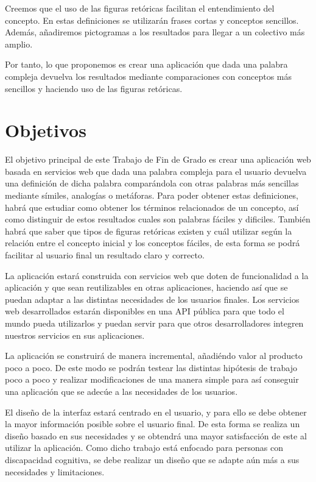 Creemos que el uso de las figuras retóricas facilitan el entendimiento del concepto. En estas definiciones se utilizarán frases cortas y conceptos sencillos. 
Además, añadiremos pictogramas a los resultados para llegar a un colectivo más amplio.

Por tanto, lo que proponemos es crear una aplicación que dada una palabra compleja devuelva los resultados mediante comparaciones con conceptos más sencillos y haciendo uso de las figuras retóricas.

\section{Objetivos}
\label{cap:sec:objetivos}

El objetivo principal de este Trabajo de Fin de Grado es crear una aplicación web basada en servicios web que dada una palabra compleja para el usuario devuelva una definición de dicha palabra comparándola con otras palabras más sencillas mediante símiles, analogías o metáforas. 
Para poder obtener estas definiciones, habrá que estudiar como obtener los términos relacionados de un concepto, así como distinguir de estos resultados cuales son palabras fáciles y dificiles. 
También habrá que saber que tipos de figuras retóricas existen y cuál utilizar según la relación entre el concepto inicial y los conceptos fáciles, de esta forma se podrá facilitar al usuario final un resultado claro y correcto.

La aplicación estará construida con servicios web que doten de funcionalidad a la aplicación y que sean reutilizables en otras aplicaciones, haciendo así que se puedan adaptar a las distintas necesidades de los usuarios finales.
Los servicios web desarrollados estarán disponibles en una API pública para que todo el mundo pueda utilizarlos y puedan servir para que otros desarrolladores integren nuestros servicios en sus aplicaciones.

La aplicación se construirá de manera incremental, añadiéndo valor al producto poco a poco. De este modo se podrán testear las distintas hipótesis de trabajo poco a poco y realizar modificaciones de una manera simple para así conseguir una aplicación que se adecúe a las necesidades de los usuarios.

El diseño de la interfaz estará centrado en el usuario, y para ello se debe obtener la mayor información posible sobre el usuario final. De esta forma se realiza un diseño basado en sus necesidades y se obtendrá una mayor satisfacción de este al utilizar la aplicación.
Como dicho trabajo está enfocado para personas con discapacidad cognitiva, se debe realizar un diseño que se adapte aún más a sus necesidades y limitaciones.


